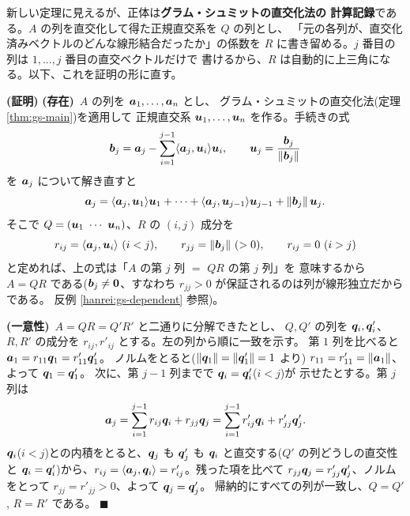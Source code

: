 新しい定理に見えるが、正体は\textbf{グラム・シュミットの直交化法の
計算記録}である。$A$ の列を直交化して得た正規直交系を $Q$ の列とし、
「元の各列が、直交化済みベクトルのどんな線形結合だったか」の係数を
$R$ に書き留める。$j$ 番目の列は $1, \dots, j$ 番目の直交ベクトルだけで
書けるから、$R$ は自動的に上三角になる。以下、これを証明の形に直す。

\noindent\textbf{(証明)}\quad
\textbf{(存在)}\ $A$ の列を $\bm{a}_1, \dots, \bm{a}_n$ とし、
グラム・シュミットの直交化法(定理 \ref{thm:gs-main})を適用して
正規直交系 $\bm{u}_1, \dots, \bm{u}_n$ を作る。手続きの式
\[
\bm{b}_j = \bm{a}_j - \sum_{i=1}^{j-1}
\langle \bm{a}_j, \bm{u}_i \rangle \bm{u}_i, \qquad
\bm{u}_j = \frac{\bm{b}_j}{\|\bm{b}_j\|}
\]
を $\bm{a}_j$ について解き直すと
\[
\bm{a}_j = \langle \bm{a}_j, \bm{u}_1 \rangle \bm{u}_1 + \cdots
+ \langle \bm{a}_j, \bm{u}_{j-1} \rangle \bm{u}_{j-1}
+ \|\bm{b}_j\|\,\bm{u}_j.
\]
そこで $Q = (\vect{u}_1 \ \cdots \ \vect{u}_n)$、$R$ の $(i, j)$ 成分を
\[
r_{ij} = \langle \bm{a}_j, \bm{u}_i \rangle \ (i < j), \qquad
r_{jj} = \|\bm{b}_j\| \ (> 0), \qquad
r_{ij} = 0 \ (i > j)
\]
と定めれば、上の式は「$A$ の第 $j$ 列 $=$ $QR$ の第 $j$ 列」を
意味するから $A = QR$ である($\bm{b}_j \neq \bm{0}$、すなわち
$r_{jj} > 0$ が保証されるのは列が線形独立だからである。
反例 \ref{hanrei:gs-dependent} 参照)。

\textbf{(一意性)}\ $A = QR = Q'R'$ と二通りに分解できたとし、
$Q, Q'$ の列を $\bm{q}_i, \bm{q}'_i$、$R, R'$ の成分を
$r_{ij}, r'_{ij}$ とする。左の列から順に一致を示す。
第 $1$ 列を比べると $\bm{a}_1 = r_{11}\bm{q}_1 = r'_{11}\bm{q}'_1$。
ノルムをとると($\|\bm{q}_1\| = \|\bm{q}'_1\| = 1$ より)
$r_{11} = r'_{11} = \|\bm{a}_1\|$、よって $\bm{q}_1 = \bm{q}'_1$。
次に、第 $j - 1$ 列までで $\bm{q}_i = \bm{q}'_i$($i < j$)が
示せたとする。第 $j$ 列は
\[
\bm{a}_j = \sum_{i=1}^{j-1} r_{ij}\bm{q}_i + r_{jj}\bm{q}_j
= \sum_{i=1}^{j-1} r'_{ij}\bm{q}_i + r'_{jj}\bm{q}'_j.
\]
$\bm{q}_i$($i < j$)との内積をとると、$\bm{q}_j$ も $\bm{q}'_j$ も
$\bm{q}_i$ と直交する($Q'$ の列どうしの直交性と
$\bm{q}_i = \bm{q}'_i$)から、$r_{ij} = \langle \bm{a}_j, \bm{q}_i
\rangle = r'_{ij}$。残った項を比べて
$r_{jj}\bm{q}_j = r'_{jj}\bm{q}'_j$、ノルムをとって
$r_{jj} = r'_{jj} > 0$、よって $\bm{q}_j = \bm{q}'_j$。
帰納的にすべての列が一致し、$Q = Q'$, $R = R'$ である。 $\blacksquare$

